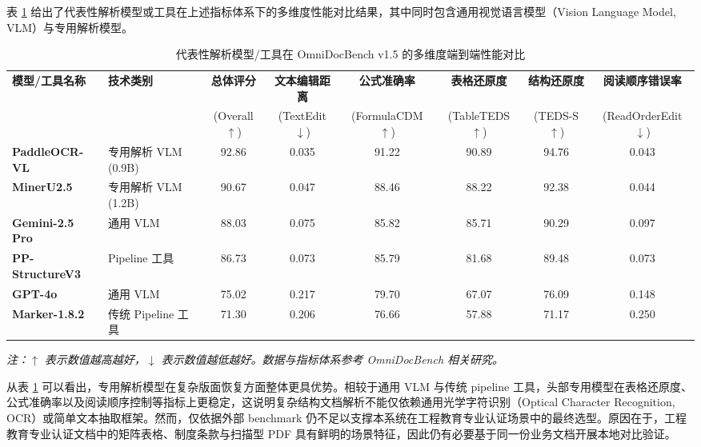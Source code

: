 \documentclass[UTF8,a4paper,zihao=-4]{ctexart}
\newcommand{\thesistablenote}[1]{\vspace{0.5ex}\par\raggedright\small\textit{注：#1}}
\begin{document}
表 \ref{tab:parser_comparison} 给出了代表性解析模型或工具在上述指标体系下的多维度性能对比结果，其中同时包含通用视觉语言模型（Vision Language Model, VLM）与专用解析模型。

\begin{table}[htbp]
  \centering
  \caption{代表性解析模型/工具在 OmniDocBench v1.5 的多维度端到端性能对比}
  \label{tab:parser_comparison}
  {\small
  \renewcommand{\arraystretch}{1.2}
  \begin{adjustbox}{max width=\textwidth}
  \begin{tabular}{llcccccc}
    \toprule
    \textbf{模型/工具名称} & \textbf{技术类别} & \textbf{总体评分} & \textbf{文本编辑距离} & \textbf{公式准确率} & \textbf{表格还原度} & \textbf{结构还原度} & \textbf{阅读顺序错误率} \\
    & & (Overall $\uparrow$) & (TextEdit $\downarrow$) & (FormulaCDM $\uparrow$) & (TableTEDS $\uparrow$) & (TEDS-S $\uparrow$) & (ReadOrderEdit $\downarrow$) \\
    \midrule
    \textbf{PaddleOCR-VL} & 专用解析 VLM (0.9B) & 92.86 & 0.035 & 91.22 & 90.89 & 94.76 & 0.043 \\
    \textbf{MinerU2.5} & 专用解析 VLM (1.2B) & 90.67 & 0.047 & 88.46 & 88.22 & 92.38 & 0.044 \\
    \textbf{Gemini-2.5 Pro} & 通用 VLM & 88.03 & 0.075 & 85.82 & 85.71 & 90.29 & 0.097 \\
    \textbf{PP-StructureV3} & Pipeline 工具 & 86.73 & 0.073 & 85.79 & 81.68 & 89.48 & 0.073 \\
    \textbf{GPT-4o} & 通用 VLM & 75.02 & 0.217 & 79.70 & 67.07 & 76.09 & 0.148 \\
    \textbf{Marker-1.8.2} & 传统 Pipeline 工具 & 71.30 & 0.206 & 76.66 & 57.88 & 71.17 & 0.250 \\
    \bottomrule
  \end{tabular}
  \end{adjustbox}
  }
  \thesistablenote{$\uparrow$ 表示数值越高越好，$\downarrow$ 表示数值越低越好。数据与指标体系参考 OmniDocBench 相关研究\cite{ouyang2024omnidocbenchbenchmarkingdiversepdf}。}
\end{table}

从表 \ref{tab:parser_comparison} 可以看出，专用解析模型在复杂版面恢复方面整体更具优势。相较于通用 VLM 与传统 pipeline 工具，头部专用模型在表格还原度、公式准确率以及阅读顺序控制等指标上更稳定，这说明复杂结构文档解析不能仅依赖通用光学字符识别（Optical Character Recognition, OCR）或简单文本抽取框架。然而，仅依据外部 benchmark 仍不足以支撑本系统在工程教育专业认证场景中的最终选型。原因在于，工程教育专业认证文档中的矩阵表格、制度条款与扫描型 PDF 具有鲜明的场景特征，因此仍有必要基于同一份业务文档开展本地对比验证。
\end{document}
